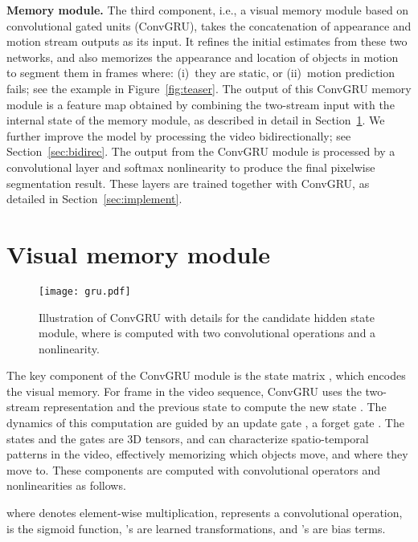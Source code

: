\documentclass[10pt,twocolumn,letterpaper]{article}
\begin{document}
\noindent \textbf{Memory module.}
The third component, i.e., a visual memory module based on convolutional gated
units (ConvGRU), takes the concatenation of appearance and motion stream
outputs as its input. It refines the initial estimates from these two networks,
and also memorizes the appearance and location of objects in motion to segment
them in frames where: (i)~they are static, or (ii)~motion prediction fails; see
the example in Figure~\ref{fig:teaser}. The output of this ConvGRU memory
module is a  feature map obtained by
combining the two-stream input with the internal state of the memory module, as
described in detail in Section~\ref{sec:recurrent}. We further improve the
model by processing the video bidirectionally; see Section~\ref{sec:bidirec}.
The output from the ConvGRU module is processed by a  convolutional
layer and softmax nonlinearity to produce the final pixelwise segmentation
result. These layers are trained together with ConvGRU, as detailed in
Section~\ref{sec:implement}.

\section{Visual memory module}
\label{sec:recurrent}
\begin{figure}[t]
\begin{center}
\texttt{[image: gru.pdf]}
\end{center}
\vspace{-0.3cm}
\caption{Illustration of ConvGRU with details for the candidate hidden state
module, where   is computed with two convolutional operations and
a  nonlinearity.}
\vspace{-0.3cm}
\label{fig:lstm}
\end{figure}

The key component of the ConvGRU module is the state matrix , which encodes
the visual memory. For frame  in the video sequence, ConvGRU uses the
two-stream representation  and the previous state  to compute the
new state . The dynamics of this computation are guided by an update gate
, a forget gate . The states and the gates are 3D tensors, and can
characterize spatio-temporal patterns in the video, effectively memorizing
which objects move, and where they move to. These components are computed with
convolutional operators and nonlinearities as follows.

where  denotes element-wise multiplication,  represents a
convolutional operation,  is the sigmoid function, 's are learned
transformations, and 's are bias terms.
\end{document}
